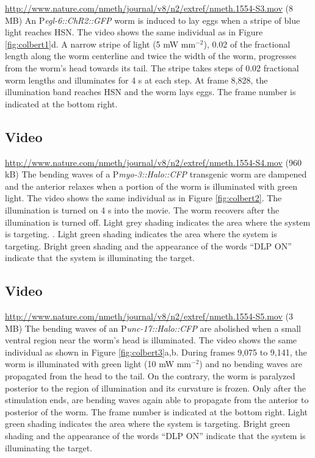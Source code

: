 \url{http://www.nature.com/nmeth/journal/v8/n2/extref/nmeth.1554-S3.mov} (8 MB)
An P\textit{egl-6::ChR2::GFP} worm is induced to lay eggs when a stripe of blue light reaches HSN. The video shows the same individual as in Figure \ref{fig:colbert1}d. A narrow stripe of light (5 mW mm$^{−2}$), 0.02 of the fractional length along the worm centerline and twice the width of the worm, progresses from the worm's head towards its tail. The stripe takes steps of 0.02 fractional worm lengths and illuminates for 4 s at each step. At frame 8,828, the illumination band reaches HSN and the worm lays eggs. The frame number is indicated at the bottom right.

\subsection{Video}\label{movie:colbert3} %

\url{http://www.nature.com/nmeth/journal/v8/n2/extref/nmeth.1554-S4.mov} (960 kB)
The bending waves of a P\textit{myo-3::Halo::CFP} transgenic worm are dampened and the anterior relaxes when a portion of the worm is illuminated with green light. The video shows the same individual as in Figure \ref{fig:colbert2}. The illumination is turned on 4 s into the movie. The worm recovers after the illumination is turned off. Light grey shading indicates the area where the system is targeting. . Light green shading indicates the area where the system is targeting. Bright green shading and the appearance of the words “DLP ON” indicate that the system is illuminating the target.

\subsection{Video}\label{movie:colbert4} %

\url{http://www.nature.com/nmeth/journal/v8/n2/extref/nmeth.1554-S5.mov} (3 MB)
The bending waves of an P\textit{unc-17::Halo::CFP} are abolished when a small ventral region near the worm's head is illuminated. The video shows the same individual as shown in Figure \ref{fig:colbert3}a,b. During frames 9,075 to 9,141, the worm is illuminated with green light (10 mW mm$^{−2}$) and no bending waves are propagated from the head to the tail. On the contrary, the worm is paralyzed posterior to the region of illumination and its curvature is frozen. Only after the stimulation ends, are bending waves again able to propagate from the anterior to posterior of the worm. The frame number is indicated at the bottom right. Light green shading indicates the area where the system is targeting. Bright green shading and the appearance of the words “DLP ON” indicate that the system is illuminating the target.

